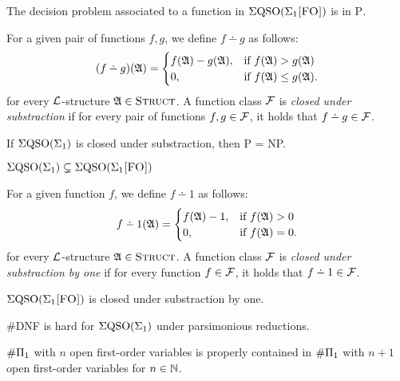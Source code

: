 \begin{theorem} \label{decisionptime}
	The decision problem associated to a function in $\Sigma{\rm QSO}(\Sigma_{1}\textsc{[FO]})$ is in \textsc{P}.
\end{theorem}

For a given pair of functions $f,g$, we define $f \dotminus g$ as follows:
\begin{eqnarray*}
	(f \dotminus g)(\A) =
	\begin{cases}
		f(\A)-g(\A), & \text{if }f(\A)>g(\A) \\
		0, & \text{if }f(\A) \leq g(\A).
	\end{cases}
\end{eqnarray*}
for every $\L$-structure $\mathfrak{A} \in \text{\sc Struct}$. A function class $\F$ is {\em closed under substraction} if for every pair of functions $f,g \in \F$, it holds that $f \dotminus g \in \F$.

\begin{theorem} \label{sub-pnp}
	If $\Sigma{\rm QSO}(\Sigma_{1})$ is closed under substraction, then {\sc P} = {\sc NP}.
\end{theorem}

\begin{theorem} \label{sigma1strict}
	$\Sigma{\rm QSO}(\Sigma_{1}) \subsetneq \Sigma{\rm QSO}(\Sigma_{1}\textsc{[FO]})$
\end{theorem}

For a given function $f$, we define $f \dotminus 1$ as follows:
\begin{eqnarray*}
	f \dotminus 1(\A) =
	\begin{cases}
		f(\A)-1, & \text{if }f(\A) > 0 \\
		0, & \text{if }f(\A) = 0.
	\end{cases}
\end{eqnarray*}
for every $\L$-structure $\mathfrak{A} \in \text{\sc Struct}$. A function class $\F$ is {\em closed under substraction by one} if for every function $f \in \F$, it holds that $f \dotminus 1 \in \F$.

\begin{theorem} \label{sigmafo-minusone}
	$\Sigma{\rm QSO}(\Sigma_{1}\textsc{[FO]})$ is closed under substraction by one.
\end{theorem}

\begin{theorem} \label{dnf-pars}
	{\sc \#DNF} is hard for $\Sigma{\rm QSO}(\Sigma_{1})$ under parsimonious reductions. 
\end{theorem}

\begin{theorem} \label{nplusone-strict}
	$\#\Pi_{1}$ with $n$ open first-order variables is properly contained in $\#\Pi_{1}$ with $n+1$ open first-order variables for $n\in\mathbb{N}$.  
\end{theorem}